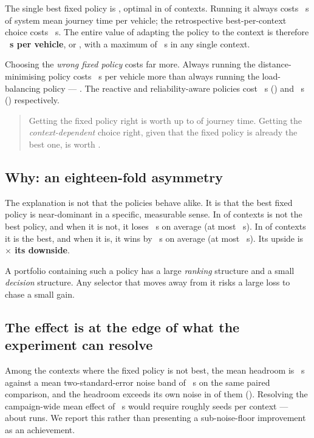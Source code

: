 The single best fixed policy is \NumGlobalSBS{}, optimal in \NumSBSOptimalPct{}
of contexts. Running it always costs \NumCostSBS~s of system mean journey time
per vehicle; the retrospective best-per-context choice costs \NumCostVBS~s. The
entire value of adapting the policy to the context is therefore
\textbf{\NumHeadroom~s per vehicle}, or \NumHeadroomPct{}, with a maximum of
\NumHeadroomMax~s in any single context.

Choosing the \emph{wrong fixed policy} costs far more. Always running the
distance-minimising policy costs \NumFixedPenPOne~s per vehicle more than
always running the load-balancing policy --- \NumFixedPenPctPOne{}. The
reactive and reliability-aware policies cost \NumFixedPenPTwo~s
(\NumFixedPenPctPTwo{}) and \NumFixedPenPFour~s (\NumFixedPenPctPFour{})
respectively.

\begin{quote}
Getting the fixed policy right is worth up to \NumFixedWorstPenaltyPct{} of
journey time. Getting the \emph{context-dependent} choice right, given that the
fixed policy is already the best one, is worth \NumHeadroomPct{}.
\end{quote}

\subsection{Why: an eighteen-fold asymmetry}

The explanation is not that the policies behave alike. It is that the best
fixed policy is near-dominant in a specific, measurable sense. In
\NumAsymNotBestPct{} of contexts \NumGlobalSBS{} is not the best policy, and
when it is not, it loses \NumAsymLoss~s on average (at most
\NumAsymMaxLoss~s). In \NumAsymBestPct{} of contexts it is the best, and when
it is, it wins by \NumAsymMargin~s on average (at most \NumAsymMaxMargin~s).
Its upside is \textbf{\NumAsymRatio$\times$ its downside}.

A portfolio containing such a policy has a large \emph{ranking} structure and a
small \emph{decision} structure. Any selector that moves away from it risks a
large loss to chase a small gain.

\subsection{The effect is at the edge of what the experiment can resolve}

Among the \NumResolvNContexts{} contexts where the fixed policy is not best, the
mean headroom is \NumResolvHeadroomNZ~s against a mean two-standard-error noise
band of \NumResolvNoiseNZ~s on the same paired comparison, and the headroom
exceeds its own noise in \NumResolvExceeds{} of them (\NumResolvExceedsPct{}).
Resolving the campaign-wide mean effect of \NumResolvHeadroom~s would require
roughly \NumResolvSeedsNeeded{} seeds per context --- about
\NumResolvRunsNeeded{} runs. We report this rather than presenting a
sub-noise-floor improvement as an achievement.

